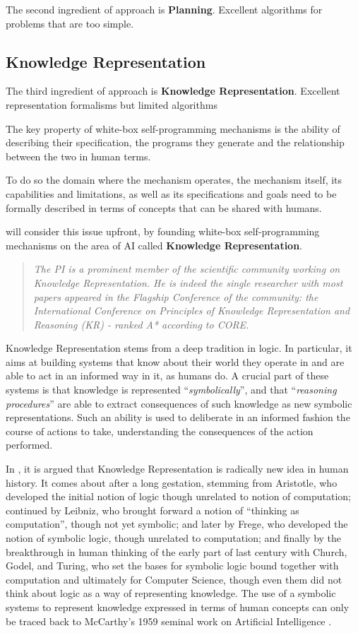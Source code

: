 The second ingredient of \project approach is \textbf{Planning}.
Excellent algorithms for problems that are too simple.

\subsection{Knowledge Representation}

The third ingredient of \project approach is \textbf{Knowledge Representation}.
Excellent representation formalisms but limited algorithms

The key property of white-box self-programming mechanisms is the
ability of describing their specification, the programs they generate
and the relationship between the two in human terms.

To do so the domain where the mechanism operates, the 
mechanism itself, its capabilities and limitations, as well as
its specifications and goals need to be formally described in terms of concepts that
can be shared with humans.

\project will consider this issue upfront, by founding white-box self-programming mechanisms on the area of AI called \textbf{Knowledge Representation}. 

\begin{quote}\it
The PI is  a prominent member of the scientific community working on Knowledge Representation. He is indeed the single researcher with most papers appeared in the Flagship Conference of the community: the International Conference on Principles of Knowledge Representation and Reasoning (KR) - ranked A* according to CORE.
\end{quote}


Knowledge Representation stems from a deep
tradition in logic. In particular, it aims at building systems that
know about their world they operate in and are able to act in an informed way in it,
as humans do.
A crucial part of these systems is that knowledge is represented
``\emph{symbolically}'', and that ``\emph{reasoning procedures}'' are able to extract
consequences of such knowledge as new symbolic representations. Such
an ability is used to deliberate in an informed fashion the course of
actions to take, understanding the consequences of the action performed.

In \cite{Leve14,Leve17}, it is argued that Knowledge Representation is
radically new idea in human history. It comes about after a long
gestation, stemming from Aristotle, who developed the initial notion
of logic though unrelated to notion of computation; continued by
Leibniz, who brought forward a notion of ``thinking as computation'',
though not yet symbolic; and later by Frege, who developed the notion
of symbolic logic, though unrelated to computation; and finally by the
breakthrough in human thinking of the early part of last century with
Church, Godel, and Turing, who set the bases for symbolic logic bound
together with computation and ultimately for Computer Science, though
even them did not think about logic as a way of representing
knowledge. The use of a symbolic systems to represent knowledge
expressed in terms of human concepts can only be traced back to
McCarthy's 1959 seminal work on Artificial Intelligence \cite{McCa57}.

